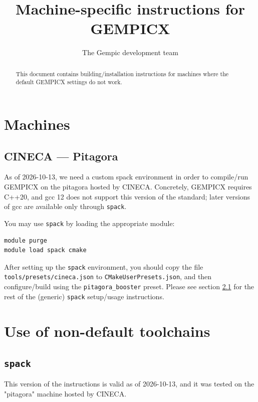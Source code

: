 \documentclass[11pt]{article}
\title{Machine-specific instructions for GEMPICX}
\author[1]{The Gempic development team}
\affil[1]{Max-Planck-Institut f\"ur Plasmaphysik, Garching, Germany}
\begin{document}
\maketitle

\begin{abstract}
    This document contains building/installation instructions for machines
    where the default GEMPICX settings do not work.
\end{abstract}

\tableofcontents

\section{Machines}

\subsection{CINECA --- Pitagora}

As of 2026-10-13, we need a custom spack environment in order to compile/run
GEMPICX on the pitagora hosted by CINECA.
Concretely, GEMPICX requires C++20, and gcc 12 does not support this
version of the standard; later
versions of gcc are available only through \texttt{spack}.

You may use \texttt{spack} by loading the appropriate module:
\begin{lstlisting}[language=bash]
module purge
module load spack cmake
\end{lstlisting}

After setting up the \texttt{spack} environment, you should copy the file
\texttt{tools/presets/cineca.json} to \texttt{CMakeUserPresets.json},
and then configure/build using the \texttt{pitagora\_booster} preset.
Please see section \ref{sec:spack} for the rest of the (generic)
\texttt{spack} setup/usage instructions.

\section{Use of non-default toolchains}

\subsection{\texttt{spack}} \label{sec:spack}

This version of the instructions is valid as of 2026-10-13, and it was
tested on the "pitagora" machine hosted by CINECA.
\end{document}
